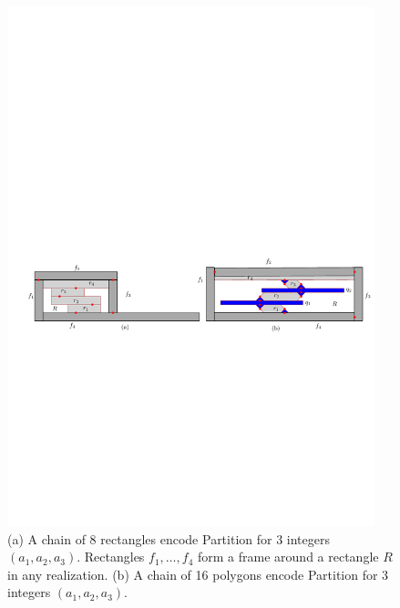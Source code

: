 \documentclass{article}
\theoremstyle{plain}%
\begin{document}
\begin{figure}[htbp]
  \centering
 \includegraphics[width=0.95\textwidth]{fig-chains}
\caption{(a) A chain of 8 rectangles encode {\sc Partition} for 3 integers $(a_1,a_2,a_3)$.
Rectangles $f_1,\ldots, f_4$ form a frame around a rectangle $R$ in any realization.
(b) A chain of 16 polygons encode {\sc Partition} for 3 integers $(a_1,a_2,a_3)$.}
\label{fig:chain}
\end{figure}
\end{document}
